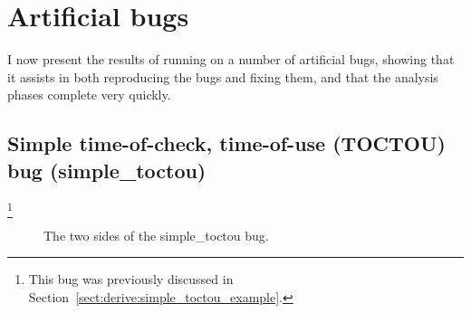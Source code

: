 \section{Artificial bugs}
\label{sect:eval:artificial}

I now present the results of running {\implementation} on a number of
artificial bugs, showing that it assists in both reproducing the bugs
and fixing them, and that the analysis phases complete very quickly.

\subsection{Simple time-of-check, time-of-use (TOCTOU) bug (simple\_toctou)}\footnote{This bug was previously discussed in
  Section~\ref{sect:derive:simple_toctou_example}.}
\label{sect:eval:simple_toctou}


\begin{figure}
  \hfill %
  \hfill
  \caption{The two sides of the simple\_toctou bug.}
  \label{fig:eval:simple_toctou}
\end{figure}

